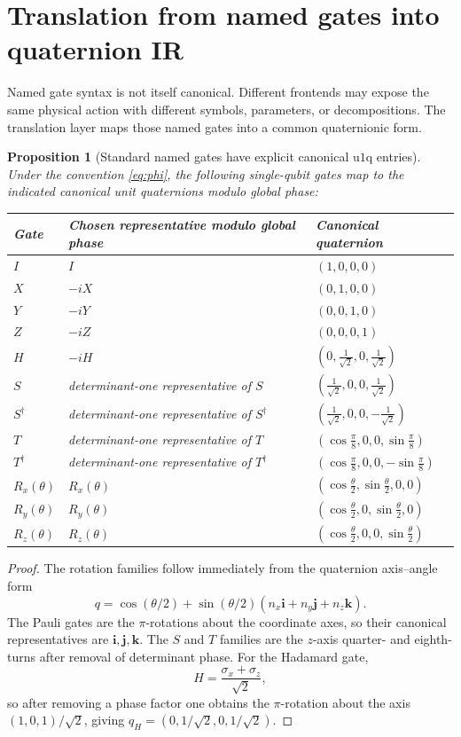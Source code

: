 \documentclass[11pt]{article}
\newtheorem{proposition}[definition]{Proposition}
\theoremstyle{remark}
\newcommand{\Id}{I}
\newcommand{\ii}{\mathbf{i}}
\newcommand{\jj}{\mathbf{j}}
\newcommand{\kk}{\mathbf{k}}
\newcommand{\uoneq}{\mathrm{u1q}}
\begin{document}
\section{Translation from named gates into quaternion IR}

Named gate syntax is not itself canonical. Different frontends may expose the
same physical action with different symbols, parameters, or decompositions. The
translation layer maps those named gates into a common quaternionic form.

\begin{proposition}[Standard named gates have explicit canonical $\uoneq$ entries]
Under the convention \eqref{eq:phi}, the following single-qubit gates map to
the indicated canonical unit quaternions modulo global phase:
\begin{center}
\begin{tabular}{@{}lll@{}}
\toprule
Gate & Chosen representative modulo global phase & Canonical quaternion \\
\midrule
$\Id$ & $\Id$ & $(1,0,0,0)$ \\
$X$ & $-iX$ & $(0,1,0,0)$ \\
$Y$ & $-iY$ & $(0,0,1,0)$ \\
$Z$ & $-iZ$ & $(0,0,0,1)$ \\
$H$ & $-iH$ & $(0,\tfrac{1}{\sqrt2},0,\tfrac{1}{\sqrt2})$ \\
$S$ & determinant-one representative of $S$ & $(\tfrac{1}{\sqrt2},0,0,\tfrac{1}{\sqrt2})$ \\
$S^\dagger$ & determinant-one representative of $S^\dagger$ & $(\tfrac{1}{\sqrt2},0,0,-\tfrac{1}{\sqrt2})$ \\
$T$ & determinant-one representative of $T$ & $(\cos\tfrac{\pi}{8},0,0,\sin\tfrac{\pi}{8})$ \\
$T^\dagger$ & determinant-one representative of $T^\dagger$ & $(\cos\tfrac{\pi}{8},0,0,-\sin\tfrac{\pi}{8})$ \\
$R_x(\theta)$ & $R_x(\theta)$ & $(\cos\tfrac{\theta}{2},\sin\tfrac{\theta}{2},0,0)$ \\
$R_y(\theta)$ & $R_y(\theta)$ & $(\cos\tfrac{\theta}{2},0,\sin\tfrac{\theta}{2},0)$ \\
$R_z(\theta)$ & $R_z(\theta)$ & $(\cos\tfrac{\theta}{2},0,0,\sin\tfrac{\theta}{2})$ \\
\bottomrule
\end{tabular}
\end{center}
\end{proposition}

\begin{proof}
The rotation families follow immediately from the quaternion axis--angle form
\[
q=\cos(\theta/2)+\sin(\theta/2)(n_x\ii+n_y\jj+n_z\kk).
\]
The Pauli gates are the $\pi$-rotations about the coordinate axes, so their
canonical representatives are $\ii,\jj,\kk$. The $S$ and $T$ families are the
$z$-axis quarter- and eighth-turns after removal of determinant phase. For the
Hadamard gate,
\[
H=\frac{\sigma_x+\sigma_z}{\sqrt2},
\]
so after removing a phase factor one obtains the $\pi$-rotation about the axis
$(1,0,1)/\sqrt2$, giving
$q_H=(0,1/\sqrt2,0,1/\sqrt2)$.
\end{proof}
\end{document}
